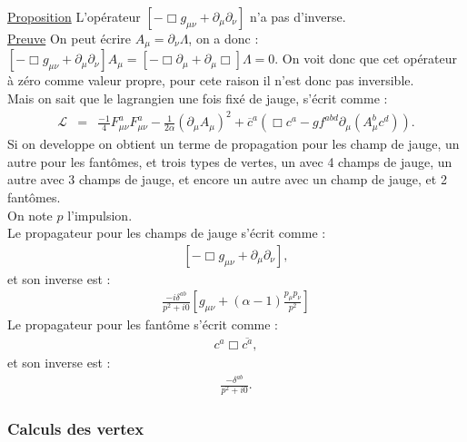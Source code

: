\documentclass[a4paper,11pt]{article} %
\theoremstyle{plain}
\theoremstyle{definition}
\theoremstyle{remark}
\numberwithin{equation}{section}
\numberwithin{equation}{subsection}
\numberwithin{figure}{section}
\begin{document}
\noindent
\underline{Proposition}
L'opérateur $\left[   - \Box g_{\mu \nu} +  \partial_{\mu} \partial_{\nu}  \right]$  n'a pas d'inverse.\\

\noindent
\underline{Preuve}
On peut écrire $A_{\mu} = \partial_{\nu} \Lambda$, on a donc :
$\left[   - \Box g_{\mu \nu} +  \partial_{\mu} \partial_{\nu}  \right] A_{\mu} = \left[   - \Box \partial_{\mu} 
+  \partial_{\mu} \Box  \right]  \Lambda = 0$. On voit donc que cet opérateur à zéro comme valeur propre, pour cete raison 
il n'est donc pas inversible.\\

\noindent
Mais on sait que le lagrangien une fois fixé de jauge, s'écrit comme :
\begin{eqnarray*}
\mathcal{L}   &=&   \frac{-1}{4} F_{\mu\nu}^{a} F_{\mu \nu}^{a} -\frac{1}{2\alpha} \left(\partial_{\mu}A_{\mu} \right)^{2} 
+ \overline{c}^{a} \left( \Box c^{a} -g f^{abd} \partial_{\mu} \left( A^{b}_{\mu} c^{d} \right) \right) .
\end{eqnarray*}
Si on developpe on obtient un terme de propagation pour les champ de jauge, un autre pour les fantômes, et trois types de vertes, 
un avec 4 champs de jauge, un autre avec 3 champs de jauge, et encore un autre avec un champ de jauge, et 2 fantômes.\\ 
On note $p$ l'impulsion.\\
Le propagateur pour les champs de jauge s'écrit comme :
\begin{eqnarray*}
 \left[   - \Box g_{\mu \nu} +  \partial_{\mu} \partial_{\nu}  \right],
\end{eqnarray*}
et son inverse est : 
\begin{eqnarray*}
 \frac{-i \delta^{ab}}{p^2 + i0} \left[ g_{\mu \nu} + (\alpha - 1)\frac{p_{\mu} p_{\nu}}{p^2}  \right]
\end{eqnarray*}
Le propagateur pour les fantôme s'écrit comme :
\begin{eqnarray*}
 c^{a}  \Box \overline{c^{a}} ,
\end{eqnarray*}
et son inverse est : 
\begin{eqnarray*}
 \frac{-\delta^{ab}}{p^2+i0} .
\end{eqnarray*}

\subsubsection{Calculs des  vertex}
\end{document}
